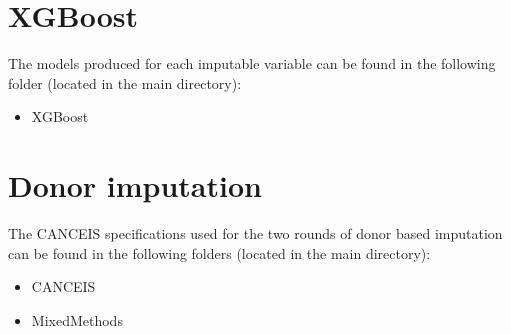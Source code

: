 \documentclass[]{book}
\providecommand{\tightlist}{%
  \setlength{\itemsep}{0pt}\setlength{\parskip}{0pt}}
\begin{document}
\section{XGBoost}\label{xgboost-1}

The models produced for each imputable variable can be found in the
following folder (located in the main directory):

\begin{itemize}
\tightlist
\item
  XGBoost
\end{itemize}

\section{Donor imputation}\label{donor-imputation}

The CANCEIS specifications used for the two rounds of donor based
imputation can be found in the following folders (located in the main
directory):

\begin{itemize}
\tightlist
\item
  CANCEIS\\
\item
  MixedMethods
\end{itemize}


\end{document}
